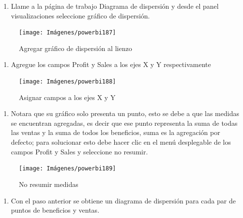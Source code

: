 \documentclass[
]{book}
\providecommand{\tightlist}{%
  \setlength{\itemsep}{0pt}\setlength{\parskip}{0pt}}
\begin{document}
\begin{enumerate}
\def\labelenumi{\arabic{enumi}.}
\tightlist
\item
  Llame a la página de trabajo Diagrama de dispersión y desde el panel visualizaciones seleccione gráfico de dispersión.
\end{enumerate}

\begin{figure}

{\centering \texttt{[image: Imágenes/powerbi187]} 

}

\caption{Agregar gráfico de dispersión al lienzo}\label{fig:paso1dispersionpowerbi-fig}
\end{figure}

\begin{enumerate}
\def\labelenumi{\arabic{enumi}.}
\setcounter{enumi}{1}
\tightlist
\item
  Agregue los campos Profit y Sales a los ejes X y Y respectivamente
\end{enumerate}

\begin{figure}

{\centering \texttt{[image: Imágenes/powerbi188]} 

}

\caption{Asignar campos a los ejes X y Y}\label{fig:paso2dispersionpowerbi-fig}
\end{figure}

\begin{enumerate}
\def\labelenumi{\arabic{enumi}.}
\setcounter{enumi}{2}
\tightlist
\item
  Notara que su gráfico solo presenta un punto, esto se debe a que las medidas se encuentran agregadas, es decir que ese punto representa la suma de todas las ventas y la suma de todos los beneficios, suma es la agregación por defecto; para solucionar esto debe hacer clic en el menú desplegable de los campos Profit y Sales y seleccione no resumir.
\end{enumerate}

\begin{figure}

{\centering \texttt{[image: Imágenes/powerbi189]} 

}

\caption{No resumir medidas}\label{fig:paso3dispersionpowerbi-fig}
\end{figure}

\begin{enumerate}
\def\labelenumi{\arabic{enumi}.}
\setcounter{enumi}{3}
\tightlist
\item
  Con el paso anterior se obtiene un diagrama de dispersión para cada par de puntos de beneficios y ventas.
\end{enumerate}
\end{document}
